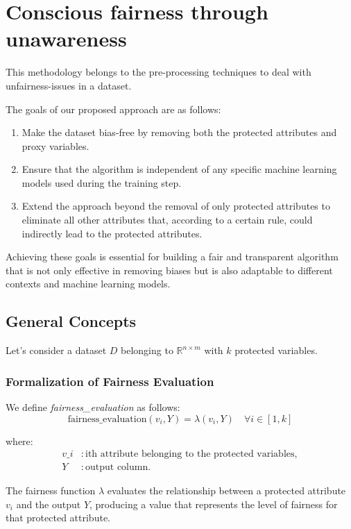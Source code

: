 \documentclass[12pt,a4paper,openright,twoside]{book}
\begin{document}
\section{Conscious fairness through unawareness}

This methodology belongs to the pre-processing techniques to deal with unfairness-issues in a dataset.

The goals of our proposed approach are as follows:
\begin{enumerate}
    \item Make the dataset bias-free by removing both the protected attributes and proxy variables.
    \item Ensure that the algorithm is independent of any specific machine learning models used during the training step.
    \item Extend the approach beyond the removal of only protected attributes to eliminate all other attributes that, according to a certain rule, could indirectly lead to the protected attributes.
\end{enumerate}

Achieving these goals is essential for building a fair and transparent algorithm that is not only effective in removing biases but is also adaptable to different contexts and machine learning models.

\subsection{General Concepts}
Let's consider a dataset \( D \) belonging to \( \mathbb{R}^{n \times m} \) with \( k \) protected variables.

\subsubsection{Formalization of Fairness Evaluation}
We define \textit{fairness\_evaluation} as follows:
\[
\text{fairness\_evaluation}(v_i, Y) = \lambda(v_i, Y) \quad \forall i \in [1, k]
\]

where:
\begin{align*}
v\_i & : \text{ith attribute belonging to the protected variables}, \\
Y & : \text{output column}.
\end{align*}

The fairness function \( \lambda \) evaluates the relationship between a protected attribute \( v_i \) and the output \( Y \), producing a value that represents the level of fairness for that protected attribute.
\end{document}
